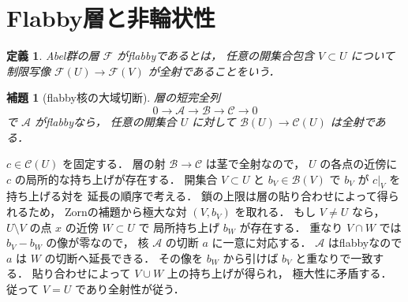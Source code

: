 \documentclass[a5paper,10pt,onecolumn]{jsarticle}
\makeatletter
\theoremstyle{mathnotetheorem}
\newtheorem{definition}[theorem]{定義}
\newtheorem{lemma}[theorem]{補題}
\renewcommand{\proofname}{証明}
\renewenvironment{proof}[1][\proofname]{%
  \par\pushQED{\qed}\normalfont\topsep4\p@\@plus2\p@\relax
  \trivlist\item[\hskip\labelsep\bfseries #1]\ignorespaces
}{\popQED\endtrivlist\@endpefalse}
\makeatother
\begin{document}
\section{Flabby層と非輪状性}

\begin{definition}
Abel群の層 $\mathcal F$ が\emph{flabby}であるとは，
任意の開集合包含 $V\subset U$ について
制限写像
$\mathcal F(U)\to\mathcal F(V)$ が全射であることをいう．
\end{definition}

\begin{lemma}[flabby核の大域切断]\label{lem:flabby-lifting}
層の短完全列
\[
 0\to\mathcal A\to\mathcal B\to\mathcal C\to0
\]
で $\mathcal A$ がflabbyなら，
任意の開集合 $U$ に対して
$\mathcal B(U)\to\mathcal C(U)$ は全射である．
\end{lemma}
\begin{proof}
$c\in\mathcal C(U)$ を固定する．
層の射 $\mathcal B\to\mathcal C$ は茎で全射なので，
$U$ の各点の近傍に $c$ の局所的な持ち上げが存在する．
開集合 $V\subset U$ と
$b_V\in\mathcal B(V)$ で $b_V$ が $c|_V$ を持ち上げる対を
延長の順序で考える．
鎖の上限は層の貼り合わせによって得られるため，
Zornの補題から極大な対 $(V,b_V)$ を取れる．
もし $V\ne U$ なら，
$U\setminus V$ の点 $x$ の近傍 $W\subset U$ で
局所持ち上げ $b_W$ が存在する．
重なり $V\cap W$ では $b_V-b_W$ の像が零なので，
核 $\mathcal A$ の切断 $a$ に一意に対応する．
$\mathcal A$ はflabbyなので $a$ は $W$ の切断へ延長できる．
その像を $b_W$ から引けば $b_V$ と重なりで一致する．
貼り合わせによって $V\cup W$ 上の持ち上げが得られ，
極大性に矛盾する．
従って $V=U$ であり全射性が従う．
\end{proof}
\end{document}
